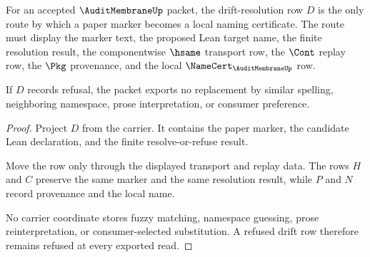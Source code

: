 \begin{theorem}
\label{thm:audit-membrane-drift-resolution}
For an accepted $\AuditMembraneUp$ packet, the drift-resolution row $D$ is the only route by which a paper marker becomes a local naming certificate. The route must display the marker text, the proposed Lean target name, the finite resolution result, the componentwise $\hsame$ transport row, the $\Cont$ replay row, the $\Pkg$ provenance, and the local $\NameCert_{\AuditMembraneUp}$ row.

If $D$ records refusal, the packet exports no replacement by similar spelling, neighboring namespace, prose interpretation, or consumer preference.
\end{theorem}
\begin{proof}
Project $D$ from the carrier. It contains the paper marker, the candidate Lean declaration, and the finite resolve-or-refuse result.

Move the row only through the displayed transport and replay data. The rows $H$ and $C$ preserve the same marker and the same resolution result, while $P$ and $N$ record provenance and the local name.

No carrier coordinate stores fuzzy matching, namespace guessing, prose reinterpretation, or consumer-selected substitution. A refused drift row therefore remains refused at every exported read.
\end{proof}


